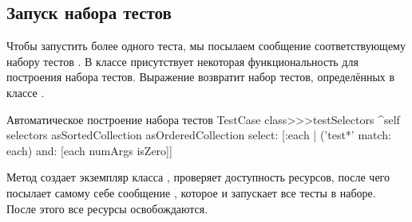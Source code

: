 \documentclass[a4paper,10pt,twoside]{book}
\begin{document}
\subsection{Запуск набора тестов }

Чтобы запустить более одного теста, мы посылаем сообщение  соответствующему набору тестов .
В классе  присутствует некоторая функциональность для построения набора тестов.
Выражение  возвратит набор тестов, определённых в классе .

\begin{method}[testcasetestselectors]{Автоматическое построение набора тестов}
TestCase class>>>testSelectors 
	^self selectors asSortedCollection asOrderedCollection select: [:each | 
		('test*' match: each) and: [each numArgs isZero]]
\end{method}

Метод  создает экземпляр класса , проверяет доступность ресурсов, после чего посылает самому себе сообщение , которое и запускает все тесты в наборе.
После этого все ресурсы освобождаются.
\end{document}
